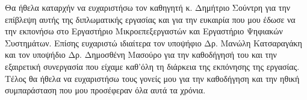 \begin{acknowledgements}
Θα ήθελα καταρχήν να ευχαριστήσω τον καθηγητή κ. Δημήτριο Σούντρη
για την επίβλεψη αυτής της διπλωματικής εργασίας και για την
ευκαιρία που μου έδωσε να την εκπονήσω στο Εργαστήριο Μικροεπεξεργαστών και Εργαστήριο Ψηφιακών Συστημάτων. Επίσης ευχαριστώ ιδιαίτερα τον υποψήφιο Δρ.
Μανώλη Κατσαραγάκη και τον υποψήδιο Δρ. Δημοσθένη Μασούρο για την καθοδήγησή του και την εξαιρετική
συνεργασία που είχαμε καθ'όλη τη διάρκεια της εκπόνησης της εργασίας. Τέλος θα ήθελα να ευχαριστήσω τους γονείς
μου για την καθοδήγηση και την ηθική συμπαράσταση που μου
προσέφεραν όλα αυτά τα χρόνια.
\end{acknowledgements}